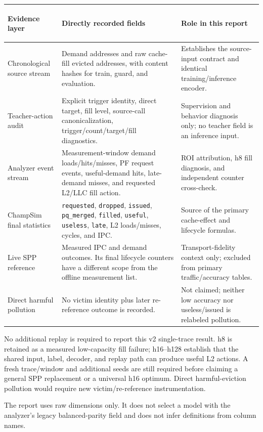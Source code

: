 \documentclass[10pt]{article}
\begin{document}
\begin{tabularx}{\textwidth}{@{}
  >{\bfseries\raggedright\arraybackslash}p{}
  >{\raggedright\arraybackslash}X
  >{\raggedright\arraybackslash}X@{}}
\toprule
Evidence layer & Directly recorded fields & Role in this report \\
\midrule
Chronological source stream &
Demand addresses and raw cache-fill evicted addresses, with content hashes for train, guard, and evaluation. &
Establishes the source-input contract and identical training/inference encoder.\\
Teacher-action audit &
Explicit trigger identity, direct target, fill level, source-call canonicalization, trigger/count/target/fill diagnostics. &
Supervision and behavior diagnosis only; no teacher field is an inference input.\\
Analyzer event stream &
Measurement-window demand loads/hits/misses, PF request events, useful-demand hits, late-demand misses, and requested L2/LLC fill action. &
ROI attribution, h8 fill diagnosis, and independent counter cross-check.\\
ChampSim final statistics &
\texttt{requested}, \texttt{dropped}, \texttt{issued},
\texttt{pq\_merged}, \texttt{filled}, \texttt{useful},
\texttt{useless}, \texttt{late}, L2 loads/misses, cycles, and IPC. &
Source of the primary cache-effect and lifecycle formulas.\\
Live SPP reference &
Measured IPC and demand outcomes. Its final lifecycle counters have a different scope from the offline measurement list. &
Transport-fidelity context only; excluded from primary traffic/accuracy tables.\\
Direct harmful pollution &
No victim identity plus later re-reference outcome is recorded. &
Not claimed; neither low accuracy nor useless/issued is relabeled pollution.\\
\bottomrule
\end{tabularx}

\begin{infobox}[title={\bfseries Reporting decision}]
No additional replay is required to report this v2 single-trace result. h8 is
retained as a measured low-capacity fill failure; h16--h128 establish that the
shared input, label, decoder, and replay path can produce useful L2 actions.
A fresh trace/window and additional seeds are still required before claiming
a general SPP replacement or a universal h16 optimum. Direct harmful-eviction
pollution would require new victim/re-reference instrumentation.
\end{infobox}

{\footnotesize The report uses raw dimensions only. It does not select a
model with the analyzer's legacy balanced-parity field and does not infer
definitions from column names.}
\end{document}
